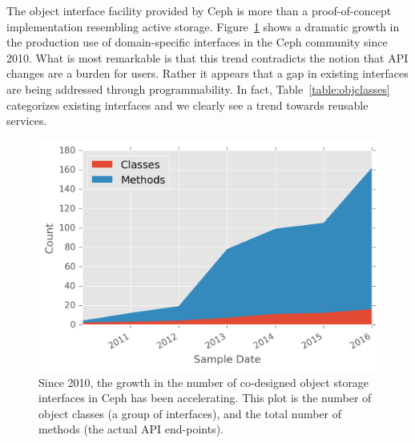 \documentclass[10pt,twocolumn]{article}
\begin{document}
The object interface facility provided by Ceph is more than
a proof-of-concept implementation resembling active storage.  Figure~\ref{fig:obj-int-dev-growth} shows a dramatic growth in the production use of
domain-specific interfaces in the Ceph community since 2010.  What is most
remarkable is that this trend contradicts the notion that API changes are a
burden for users.
Rather it appears that a gap in existing interfaces are
being addressed through programmability. In fact, Table~\ref{table:objclasses}
categorizes existing interfaces and we clearly see a trend towards reusable
services.

\begin{figure}[ht]
\centering
\includegraphics{figures/obj-int-dev-growth.png}
\caption{Since 2010, the growth in the number of co-designed object
storage interfaces in Ceph has been accelerating. This plot is the
number of object classes (a group of interfaces), and the total number
of methods (the actual API end-points).}
\label{fig:obj-int-dev-growth}
\end{figure}
\end{document}
